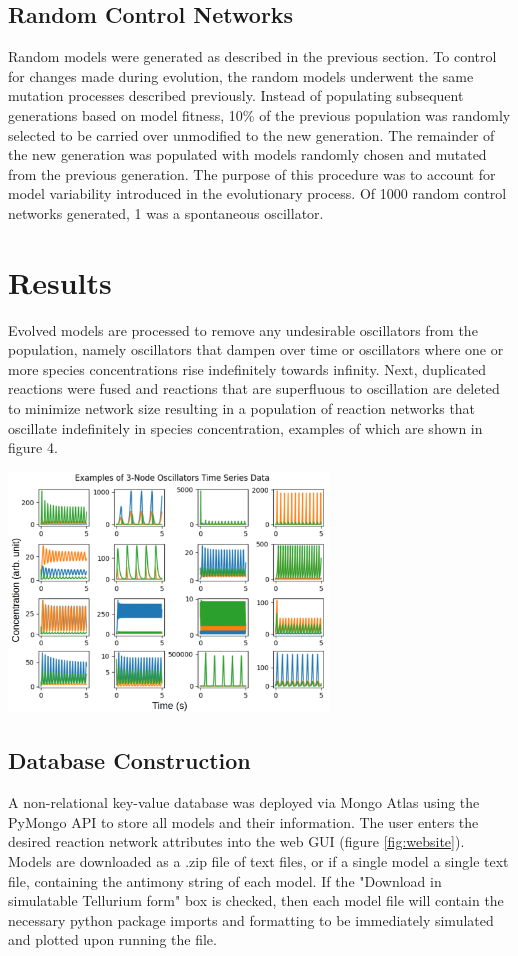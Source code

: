 \documentclass[12pt]{report}
\begin{document}
\subsection{Random Control Networks}
Random models were generated as described in the previous section. To control for changes made during evolution, the random models underwent the same mutation processes described previously. Instead of populating subsequent generations based on model fitness, 10\% of the previous population was randomly selected to be carried over unmodified to the new generation. The remainder of the new generation was populated with models randomly chosen and mutated from the previous generation. The purpose of this procedure was to account for model variability introduced in the evolutionary process. Of 1000 random control networks generated, 1 was a spontaneous oscillator.

\section{Results}
Evolved models are processed to remove any undesirable oscillators from the population, namely oscillators that dampen over time or oscillators where one or more species concentrations rise indefinitely towards infinity. Next,  duplicated reactions were fused and reactions that are superfluous to oscillation are deleted to minimize network size resulting in a population of reaction networks that oscillate indefinitely in species concentration, examples of which are shown in figure 4.

\begin{center}
    \includegraphics[width=8.5cm]{images/examples.png}
    \label{fig:examples}
\end{center}


\subsection{Database Construction}
A non-relational key-value database was deployed via Mongo Atlas using the PyMongo API to store all models and their information. The user enters the desired reaction network attributes into the web GUI (figure \ref{fig:website}). Models are downloaded as a .zip file of text files, or if a single model a single text file, containing the antimony string of each model. If the "Download in simulatable Tellurium form" box is checked, then each model file will contain the necessary python package imports and formatting to be immediately simulated and plotted upon running the file.
\end{document}
